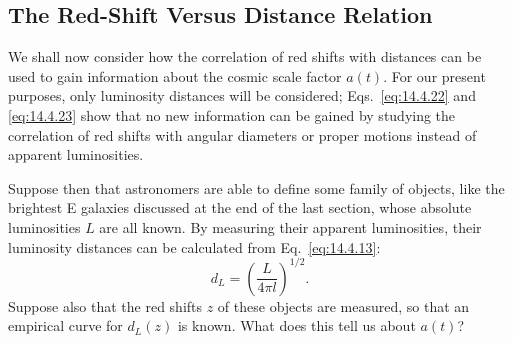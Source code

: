 %

\subsection{The Red-Shift Versus Distance Relation}\label{sec:14.6}

We shall now consider how the correlation of red shifts with distances can
be used to gain information about the cosmic scale factor \(a(t)\). For our
present purposes, only luminosity distances will be considered;
Eqs.~\eqref{eq:14.4.22} and \eqref{eq:14.4.23} show that no new information
can be gained by studying the correlation of red shifts with angular
diameters or proper motions instead of apparent luminosities.

Suppose then that astronomers are able to define some family of objects, like
the brightest E galaxies discussed at the end of the last section, whose
absolute luminosities \(L\) are all known. By measuring their apparent
luminosities, their luminosity distances can be calculated from
Eq.~\eqref{eq:14.4.13}:
\[
  d_L=\left(\frac{L}{4\pi l}\right)^{1/2}.
\]
Suppose also that the red shifts \(z\) of these objects are measured, so that
an empirical curve for \(d_L(z)\) is known. What does this tell us about
\(a(t)\)?


